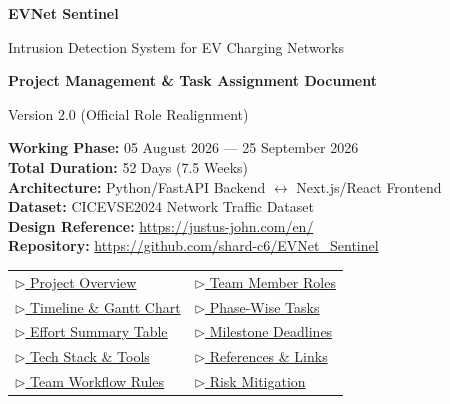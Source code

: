 \documentclass[11pt, a4paper]{article}
\begin{document}
\begin{titlepage}
\centering
\vspace*{1.5cm}

{\Huge\bfseries\textcolor{primary}{EVNet Sentinel}\par}
\vspace{0.4cm}
{\Large\textcolor{sectionblue}{Intrusion Detection System for EV Charging Networks}\par}
\vspace{1.5cm}

{\LARGE\bfseries Project Management \& Task Assignment Document\par}
\vspace{0.3cm}
{\large Version 2.0 (Official Role Realignment)\par}
\vspace{1.5cm}

\begin{tcolorbox}[colback=lightgray, colframe=darkbg, width=0.82\textwidth, rounded corners]
\centering
\textbf{Working Phase:} 05 August 2026 — 25 September 2026\\[0.3em]
\textbf{Total Duration:} 52 Days (7.5 Weeks)\\[0.3em]
\textbf{Architecture:} Python/FastAPI Backend $\longleftrightarrow$ Next.js/React Frontend\\[0.3em]
\textbf{Dataset:} CICEVSE2024 Network Traffic Dataset\\[0.3em]
\textbf{Design Reference:} \url{https://justus-john.com/en/}\\[0.3em]
\textbf{Repository:} \url{https://github.com/shard-c6/EVNet_Sentinel}
\end{tcolorbox}

\vspace{1.2cm}

\begin{tcolorbox}[colback=blue!3, colframe=primary, width=0.82\textwidth, rounded corners, title={\textbf{Quick Navigation (Click to Jump)}}]
\centering
\begin{tabular}{ll}
\hyperref[sec:overview]{\textcolor{primary}{$\triangleright$ Project Overview}} & \hyperref[sec:team]{\textcolor{primary}{$\triangleright$ Team Member Roles}} \\[0.3em]
\hyperref[sec:timeline]{\textcolor{primary}{$\triangleright$ Timeline \& Gantt Chart}} & \hyperref[sec:tasks]{\textcolor{primary}{$\triangleright$ Phase-Wise Tasks}} \\[0.3em]
\hyperref[sec:effort]{\textcolor{primary}{$\triangleright$ Effort Summary Table}} & \hyperref[sec:milestones]{\textcolor{primary}{$\triangleright$ Milestone Deadlines}} \\[0.3em]
\hyperref[sec:techstack]{\textcolor{primary}{$\triangleright$ Tech Stack \& Tools}} & \hyperref[sec:refs]{\textcolor{primary}{$\triangleright$ References \& Links}} \\[0.3em]
\hyperref[sec:workflow]{\textcolor{primary}{$\triangleright$ Team Workflow Rules}} & \hyperref[sec:risk]{\textcolor{primary}{$\triangleright$ Risk Mitigation}} \\
\end{tabular}
\end{tcolorbox}


\end{titlepage}
\end{document}
